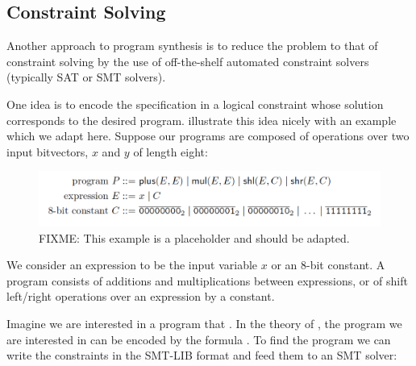 \subsection{Constraint Solving}
\label{sec:constraint-solving}

Another approach to program synthesis is to reduce the problem to that of
constraint solving by the use of off-the-shelf automated constraint
solvers~\cite{Shi:2019:FCS,Feng:2018:PSU,Feng:2017:CST,Feng:2017:CSC,Solar-Lezama:2008,Jha:oracle:2010}
(typically SAT or SMT solvers).

One idea is to encode the specification in a logical constraint whose solution
corresponds to the desired program. \citeauthor{Gulwani2017} illustrate this
idea nicely with an example~\cite{Gulwani2017} which we adapt here.
Suppose our programs are composed of operations over two input bitvectors, $x$
and $y$ of length eight:

\begin{figure}[h!]
  \centering
  \includegraphics[width=\textwidth]{assets/constraint-solving-example.png}
  \caption{FIXME: This example is a placeholder and should be adapted.}
\end{figure}

We consider an expression to be the input variable $x$ or an 8-bit constant. A
program consists of additions and multiplications between expressions, or of
shift left/right operations over an expression by a constant.

Imagine we are interested in a program that . In the theory of
, the program we are interested in can be encoded
by the formula . To find the program we can write the constraints in the SMT-LIB format
and feed them to an SMT solver:

